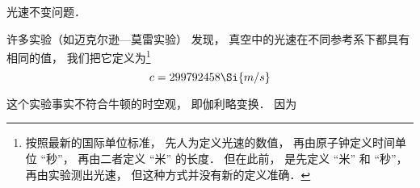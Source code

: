 
光速不变问题．

许多实验（如迈克尔逊—莫雷实验）%
发现， 真空中的光速在不同参考系下都具有相同的值， 我们把它定义为\footnote{按照最新的国际单位标准， 先人为定义光速的数值， 再由原子钟定义时间单位 “秒”， 再由二者定义 “米” 的长度． 但在此前， 是先定义 “米” 和 “秒”， 再由实验测出光速， 但这种方式并没有新的定义准确．}
\begin{equation}
c = 299792458\Si{m/s}
\end{equation}

这个实验事实不符合牛顿的时空观， 即伽利略变换． 因为

